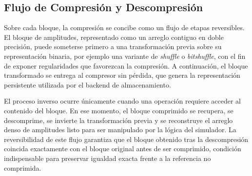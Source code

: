 \subsection{Flujo de Compresión y Descompresión}

Sobre cada bloque, la compresión se concibe como un flujo de etapas reversibles. El bloque de amplitudes, representado como un arreglo contiguo en
doble precisión, puede someterse primero a una transformación previa sobre su representación binaria, por ejemplo una variante de \emph{shuffle} o
\emph{bitshuffle}, con el fin de exponer regularidades que favorezcan la compresión. A continuación, el bloque transformado se entrega al
compresor sin pérdida, que genera la representación persistente utilizada por el backend de almacenamiento.

El proceso inverso ocurre únicamente cuando una operación requiere acceder al contenido del bloque. En ese momento, el bloque comprimido se
recupera, se descomprime, se invierte la transformación previa y se reconstruye el arreglo denso de amplitudes listo para ser manipulado por la
lógica del simulador. La reversibilidad de este flujo garantiza que el bloque obtenido tras la descompresión coincida exactamente con el bloque
original antes de ser comprimido, condición indispensable para preservar igualdad exacta frente a la referencia no comprimida.

